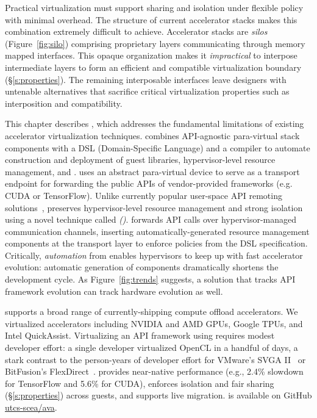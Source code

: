 Practical virtualization must support sharing and isolation under flexible
policy with minimal overhead. The structure of current accelerator stacks
makes this combination extremely difficult to achieve.
Accelerator stacks are \emph{silos} (Figure~\ref{fig:silo}) comprising
proprietary layers communicating through memory mapped interfaces.
This opaque organization makes it \emph{impractical} to interpose intermediate
layers to form an efficient and compatible virtualization boundary
(\S\ref{s:properties}).
The remaining interposable interfaces leave designers with untenable
alternatives that sacrifice critical virtualization properties such as
interposition and compatibility.

This chapter describes \AvA, which addresses the fundamental limitations of
existing accelerator virtualization techniques.
\AvA combines API-agnostic para-virtual stack components with a DSL
(Domain-Specific Language) and a compiler to automate construction and
deployment of guest libraries, hypervisor-level resource management, and
\workers. \AvA uses an abstract para-virtual device to serve as a transport
endpoint for forwarding the public APIs of vendor-provided frameworks
(e.g. CUDA or TensorFlow). Unlike currently popular user-space API remoting
solutions~\cite{bitfusion,xaas,vmCUDA,rCUDA,cu2rcu}, \AvA preserves hypervisor-level resource management and strong isolation using a novel
technique called \emph{\hirafull (\hira)}.
\hira forwards API calls over hypervisor-managed communication
channels, inserting au\-to\-ma\-tically-generated resource management
components at the transport layer to enforce policies from the DSL
specification. Critically, \emph{automation} from \AvA enables hypervisors
to keep up with fast accelerator evolution: automatic generation of components
dramatically shortens the development cycle. As Figure~\ref{fig:trends}
suggests, a solution that tracks API framework evolution can track hardware
evolution as well.

\AvA supports a broad range of currently-shipping compute offload
accelerators. We virtualized \numaccelerators accelerators including NVIDIA
and AMD GPUs, Google TPUs, and Intel QuickAssist. Virtualizing an API
framework using \AvA requires modest developer effort: a single developer
virtualized OpenCL in a handful of days, a stark contrast to the person-years
of developer effort for VMware's SVGA II~\cite{dowty2009gpu} or BitFusion's
FlexDirect~\cite{bitfusion}. \AvA provides near-native performance
(e.g., 2.4\% slowdown for TensorFlow and 5.6\% for CUDA), enforces isolation
and fair sharing (\S\ref{s:properties}) across guests, and supports live
migration. \AvA is available on GitHub \mbox{\href{https://github.com/utcs-scea/ava}{utcs-scea/ava}}.

